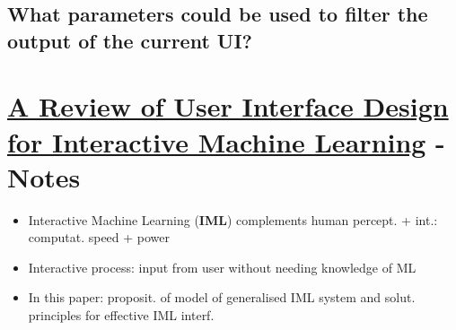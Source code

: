 \documentclass[12pt,a4paper]{article}
\begin{document}
\subsection{What parameters could be used to filter the output of the current UI?}

\section{\href{https://doi.org/10.1145/3185517}{A Review of User Interface Design for Interactive Machine Learning} - Notes}
\begin{itemize}
\item Interactive Machine Learning (\textbf{IML}) complements human percept. + int.: computat. speed + power
\item Interactive process: input from user without needing knowledge of ML
\item In this paper: proposit. of model of generalised IML system and solut. principles for effective IML interf.
\end{itemize}
\end{document}
